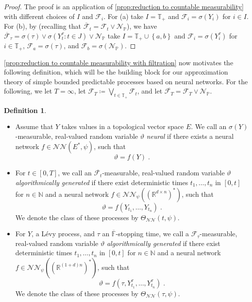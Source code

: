 \documentclass[11pt]{report}
\theoremstyle{plain} %
\theoremstyle{definition} %
\newtheorem{definition}[definition]{Definition}
\theoremstyle{remark} %
\begin{document}
\begin{proof}
    The proof is an application of \cref{prop:reduction to countable measurability} with different choices of \(I\) and \(\mathcal{F}_i\). For (a) take \(I=\mathbb{T}_+\) and \(\mathcal{F}_i=\sigma(Y_i)\) for \(i\in I\). For (b), by \parencite[Thm.~13.45]{HeWangYan1992} (recalling that \(\overline{\mathcal{F}}_t=\mathcal{F}_t\vee \mathcal{N}_{\mathbb{P}}\)), we have \(\overline{\mathcal{F}}_{\tau}=\sigma(\tau)\vee\sigma(Y_t^{\tau}:t\in J)\vee \mathcal{N}_{\mathbb{P}}\) take \(I=\mathbb{T}_+\cup\left\{a,b\right\}\) and \(\mathcal{F}_i=\sigma(Y_i^{\tau})\) for \(i\in \mathbb{T}_+\), \(\mathcal{F}_a=\sigma(\tau)\), and \(\mathcal{F}_b=\sigma(\mathcal{N}_{\mathbb{P}})\). 
\end{proof}
\cref{prop:reduction to countable measurability with filtration} now motivates the following definition, which will be the building block for our approximation theory of simple bounded predictable processes based on neural networks. For the following, we let \(T=\infty\), let \(\mathcal{F}_{T}\coloneqq\bigvee_{t\in\mathbb{T}_+}\mathcal{F}_t\), and let \(\overline{\mathcal{F}_{T}}=\mathcal{F}_{T}\vee \mathcal{N}_{\mathbb{P}}\).
\begin{definition}\label{def:algorithmic strategies}
    \begin{itemize}
        \item Assume that \(Y\) takes values in a topological vector space \(E\). We call an \(\sigma(Y)\)-measurable, real-valued random variable \(\vartheta\) \textit{neural} if there exists a neural network \(f\in\mathcal{NN}(E^*,\psi)\), such that 
        \begin{equation}
            \vartheta = f(Y)\;.
        \end{equation}
        \item For \(t\in[0,T]\), we call an \(\overline{\mathcal{F}_t}\)-measurable, real-valued random variable \(\vartheta\) \textit{algorithmically generated} if there exist deterministic times 
        \(t_1,\dots,t_n\) in \([0,t]\) for \(n\in\mathbb{N}\) and a neural network \(f\in\mathcal{NN}_\psi((\mathbb{R}^{d\times n})^*)\), such that
        \begin{equation}
            \vartheta = f(Y_{t_1},\dots,Y_{t_n})\;.
        \end{equation}
        We denote the class of these processes by \(\Theta_{\mathcal{NN}}(t,\psi)\). 
        \item
        For \(Y\), a Lévy process, and \(\tau\) an \(\overline{\mathbb{F}}\)-stopping time, we call a \(\mathcal{F}_{\tau}\)-measurable, real-valued random variable \(\vartheta\) \textit{algorithmically generated} if there exist deterministic times 
        \(t_1,\dots,t_n\) in \([0,t]\) for \(n\in\mathbb{N}\) and a neural network \(f\in\mathcal{NN}_\psi((\mathbb{R}^{(1+d)n})^*)\), such that
        \begin{equation}
            \vartheta = f(\tau,Y^{\tau}_{t_1},\dots,Y^{\tau}_{t_n})\;.
        \end{equation}
        We denote the class of these processes by \(\Theta_{\mathcal{NN}}(\tau,\psi)\). 
    \end{itemize}
\end{definition}
\end{document}
